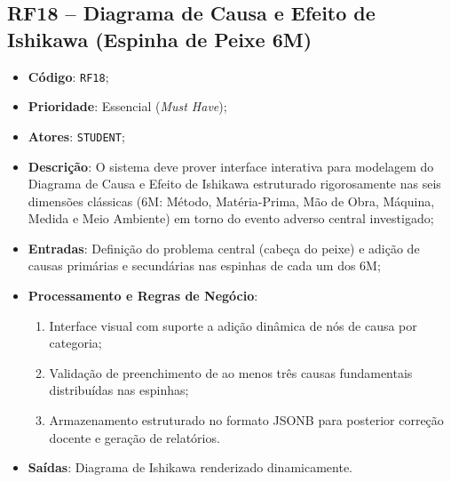 \subsection{RF18 -- Diagrama de Causa e Efeito de Ishikawa (Espinha de Peixe 6M)}
\begin{itemize}
    \item \textbf{Código}: \texttt{RF18};
    \item \textbf{Prioridade}: Essencial (\textit{Must Have});
    \item \textbf{Atores}: \texttt{STUDENT};
    \item \textbf{Descrição}: O sistema deve prover interface interativa para modelagem do Diagrama de Causa e Efeito de Ishikawa estruturado rigorosamente nas seis dimensões clássicas (6M: Método, Matéria-Prima, Mão de Obra, Máquina, Medida e Meio Ambiente) em torno do evento adverso central investigado;
    \item \textbf{Entradas}: Definição do problema central (cabeça do peixe) e adição de causas primárias e secundárias nas espinhas de cada um dos 6M;
    \item \textbf{Processamento e Regras de Negócio}:
    \begin{enumerate}
        \item Interface visual com suporte a adição dinâmica de nós de causa por categoria;
        \item Validação de preenchimento de ao menos três causas fundamentais distribuídas nas espinhas;
        \item Armazenamento estruturado no formato JSONB para posterior correção docente e geração de relatórios.
    \end{enumerate}
    \item \textbf{Saídas}: Diagrama de Ishikawa renderizado dinamicamente.
\end{itemize}

